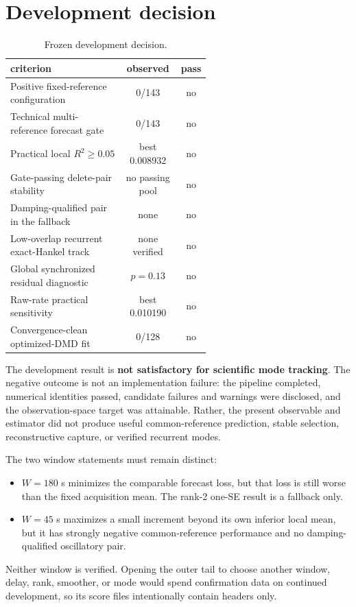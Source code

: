 \documentclass[11pt]{article}
\begin{document}
\FloatBarrier
\section{Development decision}

\begin{table}[htbp]
\centering
\caption{Frozen development decision.}
\label{tab:decision}
\begin{tabular}{p{0.58\linewidth}cc}
\toprule
criterion & observed & pass \\
\midrule
Positive fixed-reference configuration & 0/143 & no \\
Technical multi-reference forecast gate & 0/143 & no \\
Practical local \(R^2\geq0.05\) & best 0.008932 & no \\
Gate-passing delete-pair stability & no passing pool & no \\
Damping-qualified pair in the fallback & none & no \\
Low-overlap recurrent exact-Hankel track & none verified & no \\
Global synchronized residual diagnostic & \(p=0.13\) & no \\
Raw-rate practical sensitivity & best 0.010190 & no \\
Convergence-clean optimized-DMD fit & 0/128 & no \\
\bottomrule
\end{tabular}
\end{table}

The development result is \textbf{not satisfactory for scientific mode
tracking}.  The negative outcome is not an implementation failure: the
pipeline completed, numerical identities passed, candidate failures and
warnings were disclosed, and the observation-space target was attainable.
Rather, the present observable and estimator did not produce useful
common-reference prediction, stable selection, reconstructive capture, or
verified recurrent modes.

The two window statements must remain distinct:
\begin{itemize}
\item \(W=180\) s minimizes the comparable forecast loss, but that loss is
still worse than the fixed acquisition mean.  The rank-2 one-SE result is a
fallback only.
\item \(W=45\) s maximizes a small increment beyond its own inferior local
mean, but it has strongly negative common-reference performance and no
damping-qualified oscillatory pair.
\end{itemize}
Neither window is verified.  Opening the outer tail to choose another window,
delay, rank, smoother, or mode would spend confirmation data on continued
development, so its score files intentionally contain headers only.
\end{document}
